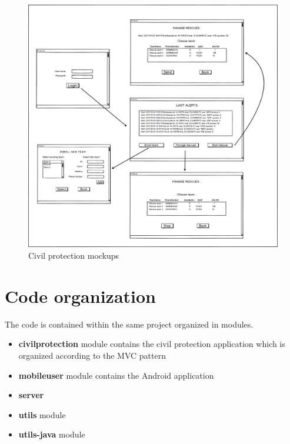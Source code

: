 \documentclass[a4paper,12pt]{report}
\begin{document}
\begin{figure}[ht]
\centering
\includegraphics[width=\textwidth]{figures/CPmockup.png}
\caption{Civil protection mockups}
\label{fig:CPmockup}
\end{figure}

\section{Code organization}
The code is contained within the same project organized in modules.
\begin{itemize}
\item \textbf{civilprotection} module contains the civil protection application which is organized according to the MVC pattern
\item \textbf{mobileuser} module contains the Android application 
\item \textbf{server} %
\item \textbf{utils} module %
\item \textbf{utils-java} module %
\end{itemize}
\end{document}
